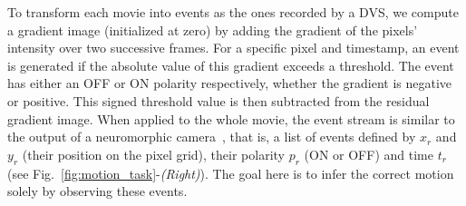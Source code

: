 \documentclass[default]{sn-jnl}%
\theoremstyle{thmstyleone}%
\theoremstyle{thmstyletwo}%
\theoremstyle{thmstylethree}%
\newcommand{\seeFig}[1]{see Fig.~\ref{fig:#1}}%
\newcommand{\arank}{r} %
\newcommand{\timev}{t} %
\newcommand{\polev}{p} %
\newcommand{\note}[1]{{\sethlcolor{yellow}\hl{#1}}}
\begin{document}
To transform each movie into events as the ones recorded by a DVS, we compute a gradient image (initialized at zero) by adding the gradient of the pixels' intensity over two successive frames. For a specific pixel and timestamp, an event is generated if the absolute value of this gradient exceeds a threshold. The event has either an OFF or ON polarity respectively, whether the gradient is negative or positive. This signed threshold value is then subtracted from the residual gradient image. When applied to the whole movie, the event stream is similar to the output of a neuromorphic camera~\citep{rasetto_challenges_2022}, that is, a list of events defined by $x_\arank$ and $y_\arank$ (their position on the pixel grid), their polarity $\polev_\arank$ (ON or OFF) and time $\timev_\arank$  (\seeFig{motion_task}-\textit{(Right)}). The goal here is to infer the correct motion solely by observing these events. 
\end{document}
